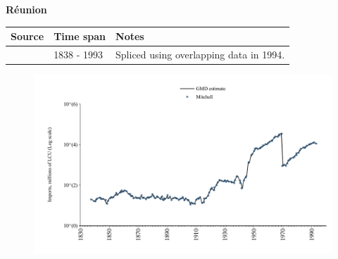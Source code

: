 \documentclass[12pt,a4paper,landscape]{article}
\begin{document}
\begin{adjustbox}{max totalsize={\paperwidth}{\paperheight},center}
\begin{minipage}[t][\textheight][t]{\textwidth}
\vspace*{0.5cm}
{}
\begin{center}
{\Large\bfseries Réunion}
\end{center}
\vspace{0.5cm}
\begin{table}[H]
\centering
\small
\begin{tabular}{|l|l|l|}
\hline
\textbf{Source} & \textbf{Time span} & \textbf{Notes} \\
\hline
\rowcolor{white}\cite{Mitchell}& 1838 - 1993 &Spliced using overlapping data in 1994.\\
\hline
\end{tabular}
\end{table}
\begin{figure}[H]
\centering
\includegraphics[width=\textwidth,height=0.6\textheight,keepaspectratio]{graphs/REU_imports.pdf}
\end{figure}
\end{minipage}
\end{adjustbox}
\end{document}

